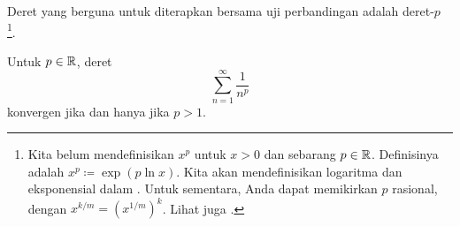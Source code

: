 Deret yang berguna untuk diterapkan bersama uji perbandingan adalah
deret-$p$%
\footnote{Kita belum mendefinisikan $x^p$ untuk $x > 0$ dan
sebarang $p \in {\mathbb{R}}$.  Definisinya adalah $x^p \coloneqq \exp ( p \ln x )$.
Kita akan mendefinisikan logaritma dan eksponensial dalam .
Untuk sementara, Anda dapat memikirkan $p$ rasional,
dengan $x^{k/m} = {(x^{1/m})}^{k}$.  Lihat juga .}.

\begin{prop}%
Untuk $p \in {\mathbb{R}}$, 
deret
\begin{equation*}
\sum_{n=1}^\infty \frac{1}{n^p}
\end{equation*}
konvergen jika dan hanya jika $p > 1$.
\end{prop}

